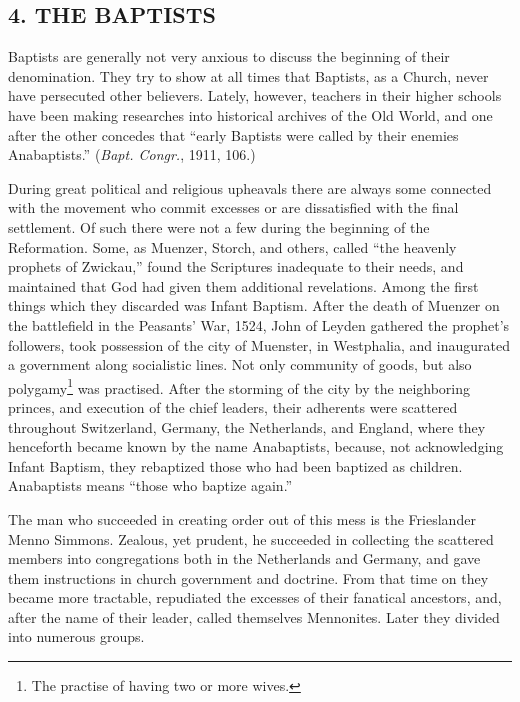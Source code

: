 \documentclass[
]{book}
\begin{document}
\subsection*{4. THE BAPTISTS}\label{the-baptists}

Baptists are generally not very anxious to discuss the beginning of their denomination. They try to show at all times that Baptists, as a Church, never have persecuted other believers. Lately, however, teachers in their higher schools have been making researches into historical archives of the Old World, and one after the other concedes that ``early Baptists were called by their enemies Anabaptists.'' (\emph{Bapt. Congr.}, 1911, 106.)

During great political and religious upheavals there are always some connected with the movement who commit excesses or are dissatisfied with the final settlement. Of such there were not a few during the beginning of the Reformation. Some, as Muenzer, Storch, and others, called ``the heavenly prophets of Zwickau,'' found the Scriptures inadequate to their needs, and maintained that God had given them additional revelations. Among the first things which they discarded was Infant Baptism. After the death of Muenzer on the battlefield in the Peasants' War, 1524, John of Leyden gathered the prophet's followers, took possession of the city of Muenster, in Westphalia, and inaugurated a government along socialistic lines. Not only community of goods, but also polygamy\footnote{The practise of having two or more wives.} was practised. After the storming of the city by the neighboring princes, and execution of the chief leaders, their adherents were scattered throughout Switzerland, Germany, the Netherlands, and England, where they henceforth became known by the name Anabaptists, because, not acknowledging Infant Baptism, they rebaptized those who had been baptized as children. Anabaptists means ``those who baptize again.''

The man who succeeded in creating order out of this mess is the Frieslander Menno Simmons. Zealous, yet prudent, he succeeded in collecting the scattered members into congregations both in the Netherlands and Germany, and gave them instructions in church government and doctrine. From that time on they became more tractable, repudiated the excesses of their fanatical ancestors, and, after the name of their leader, called themselves Mennonites. Later they divided into numerous groups.
\end{document}
